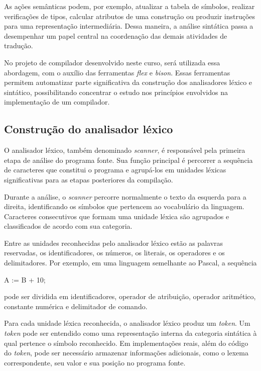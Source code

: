 \documentclass[
  brazilian,
  letterpaper,
]{book}
\newenvironment{Shaded}{\begin{snugshade}}{\end{snugshade}}
\newcommand{\DecValTok}[1]{\textcolor[rgb]{0.68,0.00,0.00}{#1}}
\newcommand{\NormalTok}[1]{\textcolor[rgb]{0.00,0.23,0.31}{#1}}
\theoremstyle{plain}
\theoremstyle{definition}
\theoremstyle{remark}
\begin{document}
As ações semânticas podem, por exemplo, atualizar a tabela de símbolos,
realizar verificações de tipos, calcular atributos de uma construção ou
produzir instruções para uma representação intermediária. Dessa maneira,
a análise sintática passa a desempenhar um papel central na coordenação
das demais atividades de tradução.

No projeto de compilador desenvolvido neste curso, será utilizada essa
abordagem, com o auxílio das ferramentas \emph{flex} e \emph{bison}.
Essas ferramentas permitem automatizar parte significativa da construção
dos analisadores léxico e sintático, possibilitando concentrar o estudo
nos princípios envolvidos na implementação de um compilador.

\subsection{Construção do analisador
léxico}\label{construuxe7uxe3o-do-analisador-luxe9xico}

O analisador léxico, também denominado \emph{scanner}, é responsável
pela primeira etapa de análise do programa fonte. Sua função principal é
percorrer a sequência de caracteres que constitui o programa e
agrupá-los em unidades léxicas significativas para as etapas posteriores
da compilação.

Durante a análise, o \emph{scanner} percorre normalmente o texto da
esquerda para a direita, identificando os símbolos que pertencem ao
vocabulário da linguagem. Caracteres consecutivos que formam uma unidade
léxica são agrupados e classificados de acordo com sua categoria.

Entre as unidades reconhecidas pelo analisador léxico estão as palavras
reservadas, os identificadores, os números, os literais, os operadores e
os delimitadores. Por exemplo, em uma linguagem semelhante ao Pascal, a
sequência

\begin{Shaded}
\begin{Highlighting}[]
\NormalTok{A := B + }\DecValTok{10}\NormalTok{;}
\end{Highlighting}
\end{Shaded}

pode ser dividida em identificadores, operador de atribuição, operador
aritmético, constante numérica e delimitador de comando.

Para cada unidade léxica reconhecida, o analisador léxico produz um
\emph{token}. Um \emph{token} pode ser entendido como uma representação
interna da categoria sintática à qual pertence o símbolo reconhecido. Em
implementações reais, além do código do \emph{token}, pode ser
necessário armazenar informações adicionais, como o lexema
correspondente, seu valor e sua posição no programa fonte.
\end{document}
